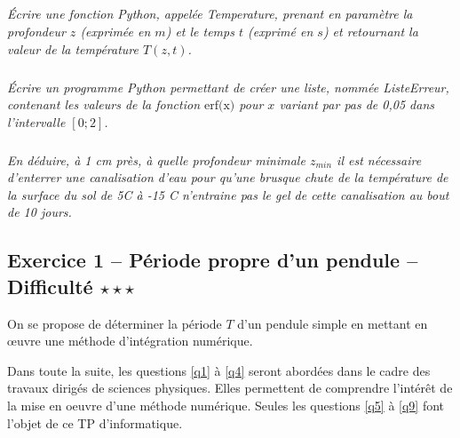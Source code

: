\documentclass[10pt,oneside]{article}
\begin{document}
\subparagraph{}
\textit{Écrire une fonction Python, appelée Temperature, prenant en paramètre la profondeur $z$ (exprimée
en $m$) et le temps $t$ (exprimé en $s$) et retournant la valeur de la température $T(z, t)$.}

\subparagraph{}
\textit{Écrire un programme Python permettant de créer une liste, nommée ListeErreur, contenant les
valeurs de la fonction $\text{erf(x)}$ pour $x$ variant par pas de 0,05 dans l’intervalle $[0 ; 2]$.}

\subparagraph{}
\textit{En déduire, à 1 cm près, à quelle profondeur minimale $z_{min}$ il est nécessaire d’enterrer une
canalisation d’eau pour qu’une brusque chute de la température de la surface du sol de 5\textdegree C à -15 \textdegree C
n’entraine pas le gel de cette canalisation au bout de 10 jours.}

\newpage 


\subsection*{Exercice 1 -- Période propre d'un pendule  -- Difficulté $\star\star\star$}
\setcounter{subparagraph}{0}

On se propose de déterminer la période $T$ d’un pendule simple en mettant en \oe{}uvre une méthode d’intégration numérique.

\begin{rem}
Dans toute la suite, les questions \ref{q1} à \ref{q4} seront abordées dans le cadre des travaux
dirigés de sciences physiques. Elles permettent de comprendre l’intérêt de la mise en oeuvre d’une
méthode numérique. Seules les questions \ref{q5} à \ref{q9} font l’objet de ce TP d’informatique.
\end{rem}
\end{document}
